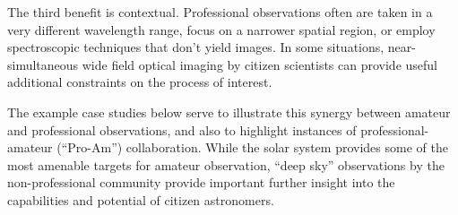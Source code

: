 \documentclass{ar2e}
\begin{document}
The third benefit is contextual.  Professional observations often are taken in a
very different wavelength range, focus on a narrower spatial region, or employ
spectroscopic techniques that don't yield images. In some situations,
near-simultaneous wide field optical imaging by citizen scientists can provide
useful additional constraints on the process of interest.

The example case studies below serve to illustrate this synergy between amateur
and professional observations, and also to highlight instances of
professional-amateur (``Pro-Am'') collaboration. While the solar system provides
some of the most amenable targets for amateur observation, ``deep sky''
observations by the non-professional community provide important further insight
into the capabilities and potential of citizen astronomers.

\end{document}
